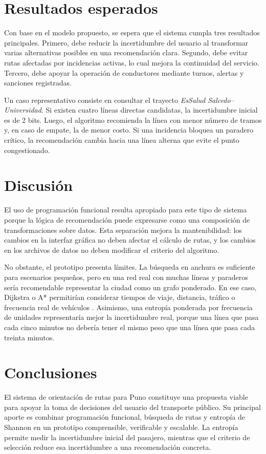 \documentclass[stu,12pt,floatsintext]{apa7}
\begin{document}
\section{Resultados esperados}
Con base en el modelo propuesto, se espera que el sistema cumpla tres resultados principales. Primero, debe reducir la incertidumbre del usuario al transformar varias alternativas posibles en una recomendación clara. Segundo, debe evitar rutas afectadas por incidencias activas, lo cual mejora la continuidad del servicio. Tercero, debe apoyar la operación de conductores mediante turnos, alertas y sanciones registradas.

Un caso representativo consiste en consultar el trayecto \textit{EsSalud Salcedo--Universidad}. Si existen cuatro líneas directas candidatas, la incertidumbre inicial es de 2 bits. Luego, el algoritmo recomienda la línea con menor número de tramos y, en caso de empate, la de menor costo. Si una incidencia bloquea un paradero crítico, la recomendación cambia hacia una línea alterna que evite el punto congestionado.

\section{Discusión}
El uso de programación funcional resulta apropiado para este tipo de sistema porque la lógica de recomendación puede expresarse como una composición de transformaciones sobre datos. Esta separación mejora la mantenibilidad: los cambios en la interfaz gráfica no deben afectar el cálculo de rutas, y los cambios en los archivos de datos no deben modificar el criterio del algoritmo.

No obstante, el prototipo presenta límites. La búsqueda en anchura es suficiente para escenarios pequeños, pero en una red real con muchas líneas y paraderos sería recomendable representar la ciudad como un grafo ponderado. En ese caso, Dijkstra o A* permitirían considerar tiempos de viaje, distancia, tráfico o frecuencia real de vehículos \parencite{cormen2009,dijkstra1959}. Asimismo, una entropía ponderada por frecuencia de unidades representaría mejor la incertidumbre real, porque una línea que pasa cada cinco minutos no debería tener el mismo peso que una línea que pasa cada treinta minutos.

\section{Conclusiones}
El sistema de orientación de rutas para Puno constituye una propuesta viable para apoyar la toma de decisiones del usuario del transporte público. Su principal aporte es combinar programación funcional, búsqueda de rutas y entropía de Shannon en un prototipo comprensible, verificable y escalable. La entropía permite medir la incertidumbre inicial del pasajero, mientras que el criterio de selección reduce esa incertidumbre a una recomendación concreta.
\end{document}
